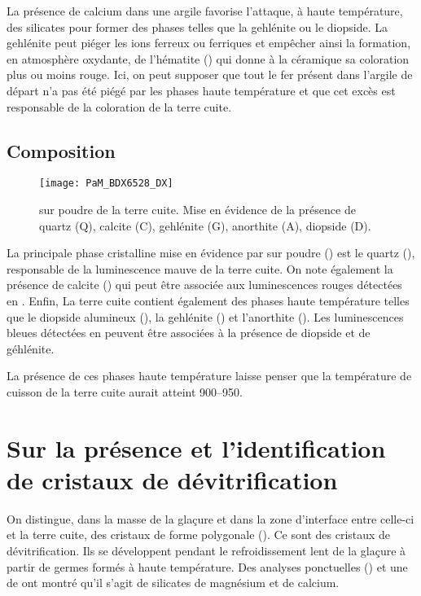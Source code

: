 La présence de calcium dans une argile favorise l'attaque, à haute 
température, des silicates pour former des phases telles que la 
gehlénite ou le diopside. La gehlénite peut piéger les ions ferreux 
ou ferriques et empêcher ainsi la formation, en atmosphère oxydante, 
de l'hématite () qui donne à la céramique sa coloration 
plus ou moins rouge. Ici, on peut supposer que tout le fer présent 
dans l'argile de départ n'a pas été piégé par les phases haute 
température et que cet excès est responsable de la coloration de 
la terre cuite.

\subsection{Composition \cristallo}
\begin{figure}[htb]
  \texttt{[image: PaM\_BDX6528\_DX]}
  \caption[\ -- \DX sur poudre de la terre cuite]
          {\legendeA 
           \DX sur poudre de la terre cuite. Mise en évidence de la présence de quartz (Q), calcite (C), gehlénite (G), anorthite (A), diopside (D).}
  \label{DRX:6528}
\end{figure}

La principale phase cristalline mise en évidence par \DX sur poudre () est le quartz (), responsable de la luminescence mauve de la terre cuite. On note également la présence de calcite () qui peut être associée aux luminescences rouges détectées en \CL. Enfin, La terre cuite contient également des phases haute température telles que le diopside alumineux (), la gehlénite () et l'anorthite (). Les luminescences bleues détectées en \CL peuvent être associées à la présence de diopside et de géhlénite.

La présence de ces phases haute température laisse penser 
que la température de cuisson de la terre cuite aurait atteint 
\SIrange[range-phrase=\ à\ ]{900}{950}{\degC}.


\section{Sur la présence et l'identification de cristaux de 
         dévitrification}

On distingue, dans la masse de la glaçure et dans la zone d'interface entre celle-ci et la terre cuite, des cristaux de forme polygonale (). Ce sont des cristaux de dévitrification. Ils se développent pendant le refroidissement lent de la glaçure à partir de germes formés à haute température. Des analyses ponctuelles () et une \carto de \RX ont montré qu'il s'agit de silicates de magnésium et de calcium.

